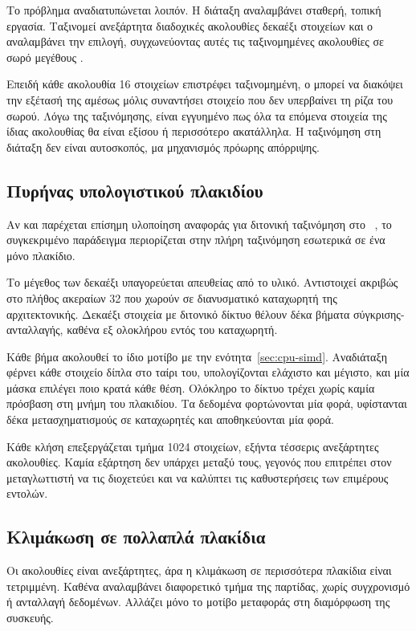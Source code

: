 Το πρόβλημα αναδιατυπώνεται λοιπόν. Η διάταξη αναλαμβάνει σταθερή, τοπική
εργασία. Ταξινομεί ανεξάρτητα διαδοχικές ακολουθίες δεκαέξι στοιχείων και ο
 αναλαμβάνει την επιλογή, συγχωνεύοντας αυτές τις ταξινομημένες
ακολουθίες σε σωρό μεγέθους .

Επειδή κάθε ακολουθία 16 στοιχείων επιστρέφει ταξινομημένη, ο  μπορεί
να διακόψει την εξέτασή της αμέσως μόλις συναντήσει στοιχείο που δεν υπερβαίνει
τη ρίζα του σωρού. Λόγω της ταξινόμησης, είναι εγγυημένο πως όλα τα επόμενα
στοιχεία της ίδιας ακολουθίας θα είναι εξίσου ή περισσότερο ακατάλληλα. Η
ταξινόμηση στη διάταξη δεν είναι αυτοσκοπός, μα μηχανισμός πρόωρης απόρριψης.

\subsection{Πυρήνας υπολογιστικού πλακιδίου}
\label{sec:npu-bitonic-kernel}

Αν και παρέχεται επίσημη υλοποίηση αναφοράς για διτονική ταξινόμηση στο ~\cite{amd2024bitonicaie}, το συγκεκριμένο παράδειγμα περιορίζεται στην
πλήρη ταξινόμηση εσωτερικά σε ένα μόνο πλακίδιο.

Το μέγεθος των δεκαέξι υπαγορεύεται απευθείας από το υλικό. Αντιστοιχεί ακριβώς
στο πλήθος ακεραίων 32  που χωρούν σε διανυσματικό καταχωρητή της
αρχιτεκτονικής. Δεκαέξι στοιχεία με διτονικό δίκτυο θέλουν δέκα βήματα
σύγκρισης-ανταλλαγής, καθένα εξ ολοκλήρου εντός του καταχωρητή.

Κάθε βήμα ακολουθεί το ίδιο μοτίβο με την ενότητα~\ref{sec:cpu-simd}.
Αναδιάταξη φέρνει κάθε στοιχείο δίπλα στο ταίρι του, υπολογίζονται ελάχιστο και
μέγιστο, και μία μάσκα επιλέγει ποιο κρατά κάθε θέση. Ολόκληρο το δίκτυο τρέχει
χωρίς καμία πρόσβαση στη μνήμη του πλακιδίου. Τα δεδομένα φορτώνονται μία φορά,
υφίστανται δέκα μετασχηματισμούς σε καταχωρητές και αποθηκεύονται μία φορά.

Κάθε κλήση επεξεργάζεται τμήμα 1024 στοιχείων, εξήντα τέσσερις ανεξάρτητες
ακολουθίες. Καμία εξάρτηση δεν υπάρχει μεταξύ τους, γεγονός που επιτρέπει στον
μεταγλωττιστή να τις διοχετεύει και να καλύπτει τις καθυστερήσεις των επιμέρους
εντολών.

\subsection{Κλιμάκωση σε πολλαπλά πλακίδια}
\label{sec:npu-bitonic-tiles}

Οι ακολουθίες είναι ανεξάρτητες, άρα η κλιμάκωση σε περισσότερα πλακίδια είναι
τετριμμένη. Καθένα αναλαμβάνει διαφορετικό τμήμα της παρτίδας, χωρίς
συγχρονισμό ή ανταλλαγή δεδομένων. Αλλάζει μόνο το μοτίβο μεταφοράς στη
διαμόρφωση της συσκευής.

